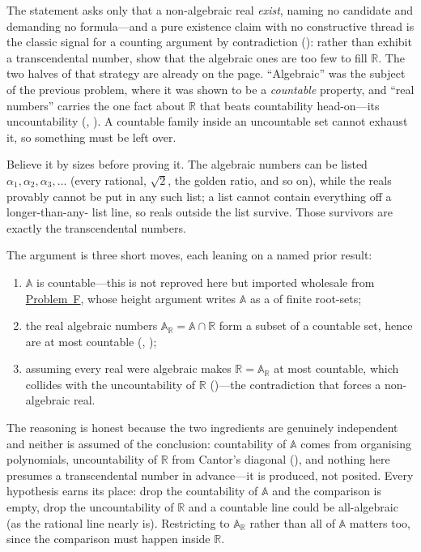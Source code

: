 \documentclass[main.tex]{subfiles}
\begin{document}
\begin{Reflection}
The statement asks only that a non-algebraic real \emph{exist}, naming no candidate and demanding no
formula---and a pure existence claim with no constructive thread is the classic signal for a counting
argument by contradiction (): rather than exhibit a transcendental number, show that the
algebraic ones are too few to fill $\mathbb R$. The two halves of that strategy are already on the
page. ``Algebraic'' was the subject of the previous problem, where it was shown to be a
\emph{countable} property, and ``real numbers'' carries the one fact about $\mathbb R$ that beats
countability head-on---its uncountability (,
). A countable family inside an uncountable set cannot exhaust it, so something must be
left over.

Believe it by sizes before proving it. The algebraic numbers can be listed
$\alpha_1,\alpha_2,\alpha_3,\dots$ (every rational, $\sqrt2$, the golden ratio, and so on), while the
reals provably cannot be put in any such list; a list cannot contain everything off a longer-than-any-
list line, so reals outside the list survive. Those survivors are exactly the transcendental numbers.

The argument is three short moves, each leaning on a named prior result:
\begin{enumerate}[leftmargin=1.7em,itemsep=3pt,topsep=2pt,label=\textnormal{(\arabic*)}]
  \item $\mathbb A$ is countable---this is not reproved here but imported wholesale from
        \hyperlink{prob:F}{Problem~F}, whose height argument writes $\mathbb A$ as a
         of finite root-sets;
  \item the real algebraic numbers $\mathbb A_{\mathbb R}=\mathbb A\cap\mathbb R$ form a subset of a
        countable set, hence are at most countable
        (, );
  \item assuming every real were algebraic makes $\mathbb R=\mathbb A_{\mathbb R}$ at most countable,
        which collides with the uncountability of $\mathbb R$ ()---the contradiction that
        forces a non-algebraic real.
\end{enumerate}

The reasoning is honest because the two ingredients are genuinely independent and neither is assumed of
the conclusion: countability of $\mathbb A$ comes from organising polynomials, uncountability of
$\mathbb R$ from Cantor's diagonal (), and nothing here presumes a transcendental number
in advance---it is produced, not posited. Every hypothesis earns its place: drop the countability of
$\mathbb A$ and the comparison is empty, drop the uncountability of $\mathbb R$ and a countable line
could be all-algebraic (as the rational line nearly is). Restricting to $\mathbb A_{\mathbb R}$ rather
than all of $\mathbb A$ matters too, since the comparison must happen inside $\mathbb R$.


\end{Reflection}
\end{document}
